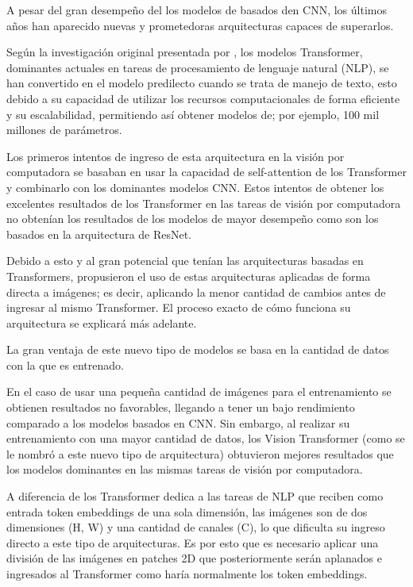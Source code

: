 A pesar del gran desempeño del los modelos de basados den CNN, los últimos años han aparecido nuevas y prometedoras arquitecturas capaces de superarlos.

Según la investigación original presentada por \cite{pr_dosovitskiy2021animageisworth}, los modelos Transformer, dominantes actuales en tareas de procesamiento de lenguaje natural (NLP), se han convertido en el modelo predilecto cuando se trata de manejo de texto, esto debido a su capacidad de utilizar los recursos computacionales de forma eficiente y su escalabilidad, permitiendo así obtener modelos de; por ejemplo, 100 mil millones de parámetros.


Los primeros intentos de ingreso de esta arquitectura en la visión por computadora se basaban en usar la capacidad de self-attention de los Transformer y combinarlo con los dominantes modelos CNN. Estos intentos de obtener los excelentes resultados de los Transformer en las tareas de visión por computadora no obtenían los resultados de los modelos de mayor desempeño como son los basados en la arquitectura de ResNet.

Debido a esto y al gran potencial que tenían las arquitecturas basadas en Transformers, propusieron el uso de estas arquitecturas aplicadas de forma directa a imágenes; es decir, aplicando la menor cantidad de cambios antes de ingresar al mismo Transformer. El proceso exacto de cómo funciona su arquitectura se explicará más adelante.

La gran ventaja de este nuevo tipo de modelos se basa en la cantidad de datos con la que es entrenado. 

En el caso de usar una pequeña cantidad de imágenes para el entrenamiento se obtienen resultados no favorables, llegando a tener un bajo rendimiento comparado a los modelos basados en CNN. Sin embargo, al realizar su entrenamiento con una mayor cantidad de datos, los Vision Transformer (como se le nombró a este nuevo tipo de arquitectura) obtuvieron mejores resultados que los modelos dominantes en las mismas tareas de visión por computadora.

A diferencia de los Transformer dedica a las tareas de NLP que reciben como entrada token embeddings de una sola dimensión, las imágenes son de dos dimensiones (H, W) y una cantidad de canales (C), lo que dificulta su ingreso directo a este tipo de arquitecturas. Es por esto que es necesario aplicar una división de las imágenes en patches 2D que posteriormente serán aplanados e ingresados al Transformer como haría normalmente los token embeddings.


